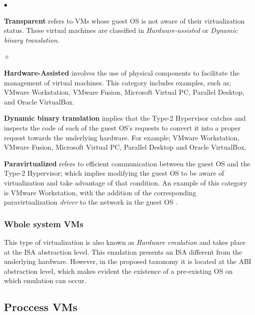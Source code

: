 	\begin{list}{$\bullet$}{\setlength{\leftmargin}{5pt}}
		
			\item \textbf{Transparent} refers to VMs whose guest OS is not aware of their virtualization status. These virtual machines are classified in \textit{Hardware-assisted} or \textit{Dynamic binary translation}.
			
			\begin{list}{$\diamond$}{\setlength{\leftmargin}{8pt}}

				\item \textbf {Hardware-Assisted} involves the use of physical components to facilitate the management of virtual machines. This category includes examples, such as; VMware Workstation, VMware Fusion, Microsoft Virtual PC, Parallel Desktop, and Oracle VirtualBox.
				
				\item \textbf{Dynamic binary translation} implies that the Type-2 Hypervisor catches and inspects the code of each of the guest OS's requests to convert it into a proper request towards the underlying hardware. For example; VMware Workstation, VMware Fusion, Microsoft Virtual PC, Parallel Desktop and Oracle VirtualBox.
			\end{list}
			
			\item \textbf {Paravirtualized} refers to efficient communication between the guest OS and the Type-2 Hypervisor; which implies modifying the guest OS to be aware of virtualization and take advantage of that condition. An example of this category is VMware Workstation, with the addition of the corresponding paravirtualization \textit{driver} to the network in the guest OS \cite {VMware2018Website}.
			
		\end{list}	

	\subsubsection{Whole system VMs}
	This type of virtualization is also known as \textit{Hardware emulation} and takes place at the ISA abstraction level.  This emulation presents an ISA different from the underlying hardware. However, in the proposed taxonomy it is located at the ABI abstraction level, which makes evident the existence of a pre-existing OS on which emulation can occur.
	
	\subsection{Proccess VMs}
	
